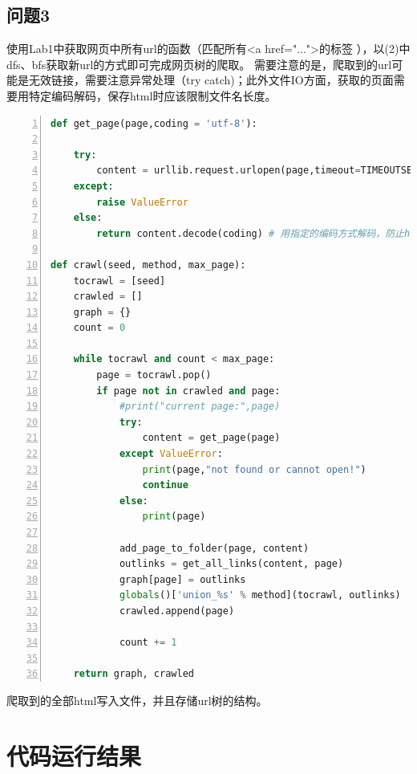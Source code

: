 \documentclass[12pt,a4paper,oneside]{article}
\begin{document}
\subsection{问题3}

使用Lab1中获取网页中所有url的函数（匹配所有<a href="...">的标签 ），以(2)中dfs、bfs获取新url的方式即可完成网页树的爬取。
需要注意的是，爬取到的url可能是无效链接，需要注意异常处理（try catch)；此外文件IO方面，获取的页面需要用特定编码解码，保存html时应该限制文件名长度。
\begin{lstlisting}[language={Python},numbers=left,numberstyle=\tiny,%frame=shadowbox, rulesepcolor=\color{red!20!green!20!blue!20},  
   keywordstyle=\color{blue!70!black},  
   commentstyle=\color{blue!90!},  
   basicstyle=\ttfamily]  
def get_page(page,coding = 'utf-8'):
    
    try:
        content = urllib.request.urlopen(page,timeout=TIMEOUTSECONDS).read()
    except:
        raise ValueError
    else:
        return content.decode(coding) # 用指定的编码方式解码，防止html乱码
        
def crawl(seed, method, max_page):
    tocrawl = [seed]
    crawled = []
    graph = {}
    count = 0

    while tocrawl and count < max_page:
        page = tocrawl.pop()
        if page not in crawled and page:
            #print("current page:",page)
            try:
                content = get_page(page)
            except ValueError:
                print(page,"not found or cannot open!")
                continue
            else:
                print(page)
           
            add_page_to_folder(page, content)
            outlinks = get_all_links(content, page)
            graph[page] = outlinks
            globals()['union_%s' % method](tocrawl, outlinks)
            crawled.append(page)

            count += 1

    return graph, crawled
\end{lstlisting}  

爬取到的全部html写入文件，并且存储url树的结构。
\section{代码运行结果}
\end{document}
